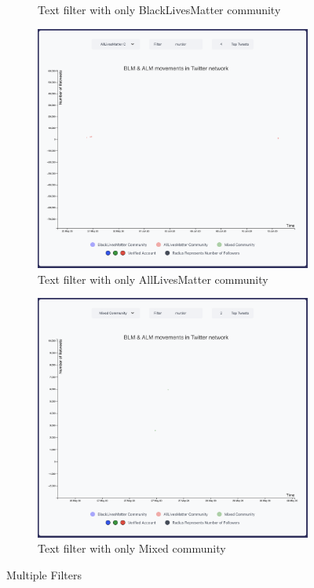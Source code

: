 \begin{figure}[H]
\begin{subfigure}{.5\textwidth}
  \caption{Text filter with only BlackLivesMatter community}
  \label{fig:sub-second}
\end{subfigure}

\begin{subfigure}{.5\textwidth}
  \centering
  \captionsetup{justification=centering}
  \includegraphics[width=1\linewidth]{Report-latex/tex_files/pics/example/almF.png}  
  \caption{Text filter with only AllLivesMatter community}
  \label{fig:sub-third}
\end{subfigure}
\begin{subfigure}{.5\textwidth}
  \centering
  \captionsetup{justification=centering}
  \includegraphics[width=1\linewidth]{Report-latex/tex_files/pics/example/mixedF.png}  
  \caption{Text filter with only Mixed community}
  \label{fig:sub-fourth}
\end{subfigure}
       
\captionsetup{justification=centering}
\caption{Multiple Filters}
\label{fig:e-m-filters}
\end{figure}
